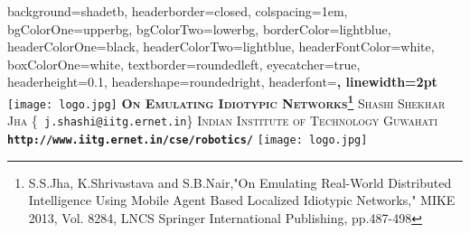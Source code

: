 \documentclass[landscape,a0paper,fontscale=0.325]{baposter} %
\begin{document}
\begin{poster}
{
background=shadetb,
headerborder=closed, %
colspacing=1em, %
bgColorOne=upperbg, %
bgColorTwo=lowerbg, %
borderColor=lightblue, %
headerColorOne=black, %
headerColorTwo=lightblue, %
headerFontColor=white, %
boxColorOne=white, %
textborder=roundedleft, %
eyecatcher=true, %
headerheight=0.1\textheight, %
headershape=roundedright, %
headerfont=\Large\bf\textsc, %
linewidth=2pt %
}
%
{\texttt{[image: logo.jpg]}} %
{\bf\textsc{ \color{darkbrown}On Emulating Idiotypic Networks\footnote[1]{S.S.Jha, K.Shrivastava and S.B.Nair,"On Emulating Real-World Distributed Intelligence Using Mobile Agent Based Localized Idiotypic
Networks," MIKE 2013, Vol. 8284, LNCS Springer International Publishing, pp.487-498}}\vspace{0.5em}} %
{\textsc{Shashi Shekhar Jha} \{\MakeLowercase{\texttt{ j.shashi@iitg.ernet.in}}\} \hspace{12pt} \textsc{Indian Institute of Technology Guwahati}{\\ \scriptsize \texttt{\textbf{http://www.iitg.ernet.in/cse/robotics/}}}} %
{\texttt{[image: logo.jpg]}} %



\end{poster}
\end{document}
